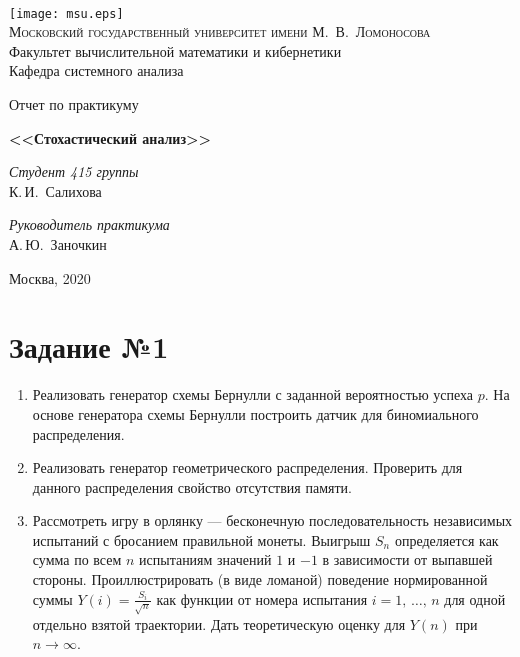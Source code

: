 \documentclass[a4paper, 11pt]{article}
\theoremstyle{def}
\theoremstyle{th}
\theoremstyle{rem}
\begin{document}
        \thispagestyle{empty}
\begin{center}
    \ \vspace{-3cm}

    \texttt{[image: msu.eps]}\\

    {\scshape Московский государственный университет имени М.~В.~Ломоносова}\\
    Факультет вычислительной математики и кибернетики\\
    Кафедра системного анализа

    \vfill

    {\LARGE Отчет по практикуму}

    \vspace{1cm}

    {\Huge\bfseries <<Стохастический анализ>>}
\end{center}

\vspace{3cm}

\begin{flushright}
    \large
    \textit{Студент 415 группы}\\
    К.\,И.~Салихова

    \vspace{5mm}

    \textit{Руководитель практикума}\\
    А.\,Ю.~Заночкин
\end{flushright}

\vfill

\begin{center}
    Москва, 2020
\end{center}

\clearpage
\tableofcontents
\clearpage
 \section{Задание №1} \label{task_01}

\begin{enumerate}
        \item Реализовать генератор схемы Бернулли с заданной вероятностью успеха $p$. На основе генератора схемы Бернулли построить датчик для биномиального распределения.
        \item Реализовать генератор геометрического распределения. Проверить для данного распределения свойство отсутствия памяти.
        \item Рассмотреть игру в орлянку --- бесконечную последовательность независимых испытаний с бросанием правильной монеты. Выигрыш $S_n$ определяется как сумма по всем $n$ испытаниям значений $1$ и $-1$ в зависимости от выпавшей стороны. Проиллюстрировать (в виде ломаной) поведение нормированной суммы $Y(i) = \frac{S_i}{\sqrt{n}}$ как функции от номера испытания $i = 1,\,\ldots,\,n$ для одной отдельно взятой траектории. Дать теоретическую оценку для $Y(n)$ при $n\to\infty$.
\end{enumerate}
\end{document}

